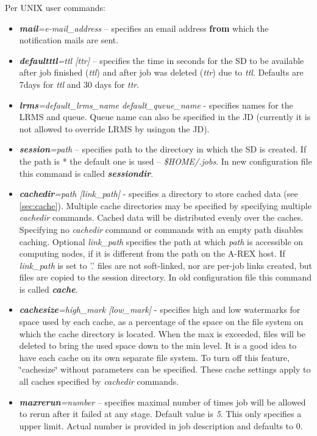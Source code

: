 \documentclass{article}                            %
\begin{document}
Per UNIX user commands:

\begin{itemize}
\item \textbf{\textit{mail}}\textit{=e-mail\_address} -- specifies an email
address \textbf{from} which the notification mails are sent.
\item \textbf{\textit{defaultttl}}\textit{=ttl {[}ttr]} -- specifies the
time in seconds for the SD to be available after job finished (\emph{ttl})
and after job was deleted (\emph{ttr}) due to \emph{ttl}. Defaults
are 7days for \emph{ttl} and 30 days for \emph{ttr}.
\item \textbf{\textit{lrms}}\textit{=default\_lrms\_name default\_queue\_name}
- specifies names for the LRMS and queue. Queue name can also be specified
in the JD (currently it is not allowed to override LRMS by usingon
the JD).
\item \textbf{\textit{session}}\textit{=path} -- specifies path to the directory
in which the SD is created. If the path is {*} the default one is
used -- \textit{\$HOME/.jobs}. In new configuration file this command
is called \textbf{\textit{sessiondir}}.
\item \textbf{\textit{cachedir}}\textit{=path {[}link\_path]} - specifies
a directory to store cached data (see \ref{sec:cache}).\emph{ }Multiple
cache directories may be specified by specifying multiple \emph{cachedir}
commands. Cached data will be distributed evenly over the caches.
Specifying no \emph{cachedir }command or commands with an empty path
disables caching. Optional \textit{link\_path} specifies the path
at which \emph{path} is accessible on computing nodes, if it is different
from the path on the A-REX host. If \textit{link\_path} is set to '.'
files are not soft-linked, nor are per-job links created, but files
are copied to the session directory. In old configuration file this
command is called \textbf{\textit{cache}}.
\item \textbf{\textit{cachesize}}\textit{=high\_mark {[}low\_mark]} - specifies
high and low watermarks for space used by each cache, as a percentage
of the space on the file system on which the cache directory is located.
When the max is exceeded, files will be deleted to bring the used
space down to the min level. It is a good idea to have each cache
on its own separate file system. To turn off this feature, \char`\"{}cachesize\char`\"{}
without parameters can be specified. These cache settings apply to
all caches specified by \emph{cachedir} commands.
\item \textbf{\textit{maxrerun}}\textit{=number} -- specifies maximal number
of times job will be allowed to rerun after it failed at any stage.
Default value is \emph{5}. This only specifies a upper limit. Actual
number is provided in job description and defaults to 0.
\end{itemize}
\end{document}
